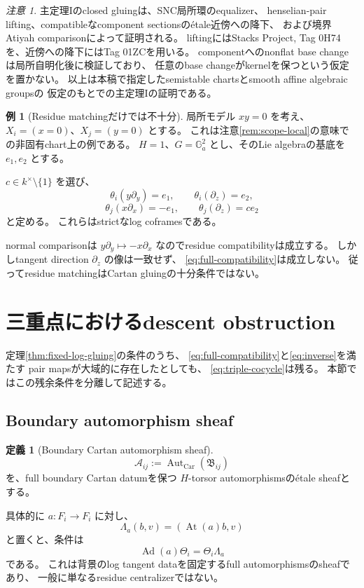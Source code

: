 \documentclass[uplatex,dvipdfmx,11pt]{jsarticle}
\numberwithin{equation}{section}
\theoremstyle{plain}
\theoremstyle{definition}
\newtheorem{definition}[theorem]{定義}
\newtheorem{example}[theorem]{例}
\theoremstyle{remark}
\newtheorem{remark}[theorem]{注意}
\DeclareMathOperator{\At}{At}
\DeclareMathOperator{\Ad}{Ad}
\DeclareMathOperator{\Aut}{Aut}
\newcommand{\GG}{\mathbb G}
\newcommand{\Car}{\mathrm{Car}}
\newcommand{\calB}{\mathfrak B}
\begin{document}
\begin{remark}
\label{rem:gluing-proof-status}
主定理Iのclosed gluingは、SNC局所環のequalizer、
henselian-pair lifting、compatibleなcomponent sectionsのétale近傍への降下、
および境界Atiyah comparisonによって証明される。
liftingにはStacks Project, Tag 0H74を、近傍への降下にはTag 01ZCを用いる。
componentへのnonflat base changeは局所自明化後に検証しており、
任意のbase changeがkernelを保つという仮定を置かない。
以上は本稿で指定したsemistable chartsとsmooth affine algebraic groupsの
仮定のもとでの主定理Iの証明である。
\end{remark}


\begin{example}[Residue matchingだけでは不十分]
\label{ex:residue-not-enough}
局所モデル \(xy=0\) を考え、
\(X_i=(x=0)\)、\(X_j=(y=0)\) とする。
これは注意\ref{rem:scope-local}の意味での非固有chart上の例である。
\(H=1\)、\(G=\GG_a^2\) とし、そのLie algebraの基底を \(e_1,e_2\) とする。

\(c\in k^\times\setminus\{1\}\) を選び、
\[
\theta_i(y\partial_y)=e_1,\qquad
\theta_i(\partial_z)=e_2,
\]
\[
\theta_j(x\partial_x)=-e_1,\qquad
\theta_j(\partial_z)=c e_2
\]
と定める。
これらはstrictなlog coframesである。

normal comparisonは
\(y\partial_y\mapsto-x\partial_x\)
なのでresidue compatibilityは成立する。
しかしtangent direction \(\partial_z\) の像は一致せず、
\eqref{eq:full-compatibility}は成立しない。
従ってresidue matchingはCartan gluingの十分条件ではない。
\end{example}

\section{三重点におけるdescent obstruction}
\label{sec:triple-obstruction}

定理\ref{thm:fixed-log-gluing}の条件のうち、
\eqref{eq:full-compatibility}と\eqref{eq:inverse}を満たす
pair mapsが大域的に存在したとしても、
\eqref{eq:triple-cocycle}は残る。
本節ではこの残余条件を分離して記述する。

\subsection{Boundary automorphism sheaf}

\begin{definition}[Boundary Cartan automorphism sheaf]
\label{def:boundary-aut}
\[
\mathscr A_{ij}:=\Aut_{\Car}(\calB_{ij})
\]
を、full boundary Cartan datumを保つ \(H\)-torsor automorphismsのétale sheafとする。

具体的に \(a:F_i\to F_i\) に対し、
\[
\Lambda_a(b,v)=(\At(a)b,v)
\]
と置くと、条件は
\[
\Ad(a)\Theta_i=\Theta_i\Lambda_a
\]
である。
これは背景のlog tangent dataを固定するfull automorphismsのsheafであり、
一般に単なるresidue centralizerではない。
\end{definition}
\end{document}
